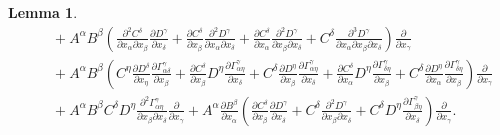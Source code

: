 \documentclass[11pt]{amsart}
\newtheorem{lemma}[theorem]{Lemma}
\theoremstyle{definition}
\theoremstyle{remark}
\numberwithin{equation}{section}
\begin{document}
\begin{lemma}
\begin{equation}
\begin{split}
          &\quad+A^\alpha B^\beta\left(\frac{\partial ^2C^\delta}{\partial x_\alpha\partial x_\beta}\frac{\partial D^\gamma}{\partial x_\delta} +\frac{\partial C^\delta}{\partial x_\beta}\frac{\partial^2 D^\gamma}{\partial x_\alpha\partial x_\delta}+\frac{\partial C^\delta}{\partial x_\alpha}\frac{\partial^2 D^\gamma}{\partial x_\beta\partial x_\delta} +  C^\delta\frac{\partial^3 D^\gamma}{\partial x_\alpha\partial x_\beta\partial x_\delta} \right)\frac{\partial}{\partial x_\gamma}\\
          &\quad+A^\alpha B^\beta\left(C^\eta\frac{\partial D^\delta}{\partial x_\eta}\frac{\partial \Gamma_{\alpha\delta}^\gamma}{\partial x_\beta} +\frac{\partial C^\delta  }{\partial x_\beta}D^\eta\frac{\partial \Gamma^\gamma_{\alpha\eta}}{\partial x_\delta} + C^\delta\frac{\partial D^\eta}{\partial x_\beta}\frac{\partial \Gamma^\gamma_{\alpha\eta}}{\partial x_\delta}+\frac{\partial C^\delta }{\partial x_\alpha}D^\eta\frac{\partial \Gamma^\gamma_{\delta \eta}}{\partial x_\beta} +C^\delta \frac{\partial D^\eta}{\partial x_\alpha}\frac{\partial \Gamma^\gamma_{\delta \eta}}{\partial x_\beta} \right)\frac{\partial}{\partial x_\gamma}\\
          &\quad+A^\alpha B^\beta C^\delta D^\eta\frac{\partial^2 \Gamma^\gamma_{\alpha \eta}}{\partial x_\beta\partial x_\delta} \frac{\partial}{\partial x_\gamma}+A^\alpha\frac{\partial B^\beta}{\partial x_\alpha}\left(\frac{\partial C^\delta}{\partial x_\beta}\frac{\partial D^\gamma}{\partial x_\delta}+ C^\delta\frac{\partial^2 D^\gamma}{\partial x_\beta\partial x_\delta}+ C^\delta D^\eta\frac{\partial \Gamma^\gamma_{\beta \eta}}{\partial x_\delta}\right)\frac{\partial}{\partial x_\gamma}.
        \end{split}
    \end{equation}
\end{lemma}
\end{document}
